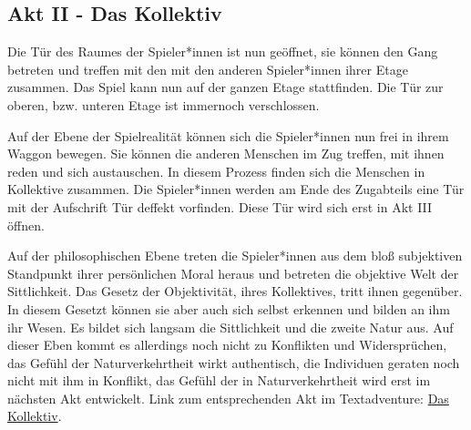 \documentclass[12pt, a4paper, openany]{report}
\let\tempone\itemize
\let\temptwo\enditemize
\renewenvironment{itemize}{\tempone\addtolength{\itemsep}{-0.5\baselineskip}}{\temptwo}
\begin{document}
\subsection{Akt II - Das Kollektiv}
\begin{itemize}
\item[R] Die Tür des Raumes der Spieler*innen ist nun geöffnet, sie können den Gang betreten und treffen mit den mit den anderen Spieler*innen ihrer Etage zusammen.
Das Spiel kann nun auf der ganzen Etage stattfinden. 
Die Tür zur oberen, bzw. unteren Etage ist immernoch verschlossen.
\item[SR] Auf der Ebene der Spielrealität können sich die Spieler*innen nun frei in ihrem Waggon bewegen. 
Sie können die anderen Menschen im Zug treffen, mit ihnen reden und sich austauschen. 
In diesem Prozess finden sich die Menschen in Kollektive zusammen.
Die Spieler*innen werden am Ende des Zugabteils eine Tür mit der Aufschrift \glqq Tür deffekt\grqq{} vorfinden.
Diese Tür wird sich erst in Akt III öffnen.
\item[P] Auf der philosophischen Ebene treten die Spieler*innen aus dem bloß subjektiven Standpunkt ihrer persönlichen Moral heraus und betreten die objektive Welt der Sittlichkeit.
Das Gesetz der Objektivität, ihres Kollektives, tritt ihnen gegenüber.
In diesem Gesetzt können sie aber auch sich selbst erkennen und bilden an ihm ihr Wesen. 
Es bildet sich langsam die Sittlichkeit und die zweite Natur aus.
Auf dieser Eben kommt es allerdings noch nicht zu Konflikten und Widersprüchen, das Gefühl der Naturverkehrtheit wirkt authentisch, die Individuen geraten noch nicht mit ihm in Konflikt, das Gefühl der in Naturverkehrtheit wird erst im nächsten Akt entwickelt.
\end{itemize}
Link zum entsprechenden Akt im Textadventure: \hyperref[das-kollektiv]{Das Kollektiv}.
\end{document}
